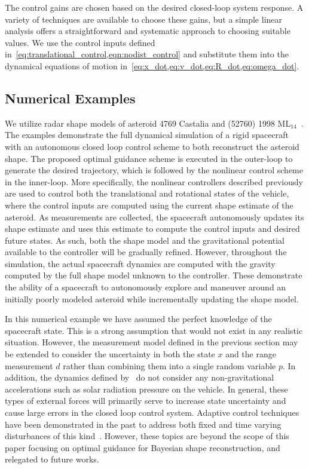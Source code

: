 \documentclass[smallextended]{svjour3}       %
\begin{document}
The control gains are chosen based on the desired closed-loop system response. 
A variety of techniques are available to choose these gains, but a simple linear analysis offers a straightforward and systematic approach to choosing suitable values. 
We use the control inputs defined in~\cref{eq:translational_control,eqn:nodist_control} and substitute them into the dynamical equations of motion in~\cref{eq:x_dot,eq:v_dot,eq:R_dot,eq:omega_dot}.

\subsection{Numerical Examples}

We utilize radar shape models of asteroid \num{4769} Castalia and (\num{52760}) \num{1998} \(\text{ML}_{14}\)~\cite{neese2004}.
The examples demonstrate the full dynamical simulation of a rigid spacecraft with an autonomous closed loop control scheme to both reconstruct the asteroid shape.
The proposed optimal guidance scheme is executed in the outer-loop to generate the desired trajectory, which is followed by the nonlinear control scheme in the inner-loop. 
More specifically, the nonlinear controllers described previously are used to control both the translational and rotational states of the vehicle, where the control inputs are computed using the current shape estimate of the asteroid. 
As measurements are collected, the spacecraft autonomously updates its shape estimate and uses this estimate to compute the control inputs and desired future states.
As such, both the shape model and the gravitational potential available to the controller will be gradually refined. 
However, throughout the simulation, the actual spacecraft dynamics are computed with the gravity computed by the full shape model unknown to the controller.
These demonstrate the ability of a spacecraft to autonomously explore and maneuver around an initially poorly modeled asteroid while incrementally updating the shape model.

In this numerical example we have assumed the perfect knowledge of the spacecraft state. 
This is a strong assumption that would not exist in any realistic situation. 
However, the measurement model defined in the previous section may be extended to consider the uncertainty in both the state \( x \) and the range measurement \( d \) rather than combining them into a single random variable \( p \).
In addition, the dynamics defined by~ do not consider any non-gravitational accelerations such as solar radiation pressure on the vehicle.
In general, these types of external forces will primarily serve to increase state uncertainty and cause large errors in the closed loop control system.
Adaptive control techniques have been demonstrated in the past to address both fixed and time varying disturbances of this kind~\cite{kulumani2017a}.
However, these topics are beyond the scope of this paper focusing on optimal guidance for Bayesian shape reconstruction, and relegated to future works. 
\end{document}
